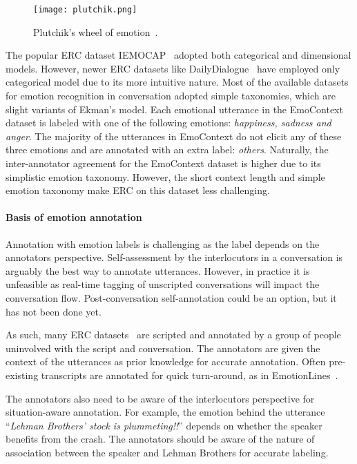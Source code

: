 \documentclass{IEEEtran}\usepackage[pdftex]{graphicx}
\begin{document}
	\begin{figure}
		\centering
		\texttt{[image: plutchik.png]}
		\caption{Plutchik's wheel of emotion~\citep{plutchik}.}
		\label{fig:plutchik}
	\end{figure}
	
	The popular ERC dataset IEMOCAP~\citep{busso2008iemocap} adopted both
	categorical and dimensional models. However, newer ERC datasets like
	DailyDialogue~\citep{li2017dailydialog} have employed only categorical model due to its more 
	intuitive nature. Most of the available datasets for emotion recognition in conversation adopted simple taxonomies, which are slight variants of Ekman's model. Each emotional utterance in the EmoContext dataset is labeled with one of the following emotions: \emph{happiness, sadness and anger}. The majority of the utterances in EmoContext do not elicit any of these three emotions and are annotated with an extra label: \emph{others}. Naturally, the inter-annotator agreement for the EmoContext dataset is higher due to its simplistic emotion taxonomy. However, the short context length and simple emotion taxonomy make ERC on this dataset less challenging.
	
	\paragraph{Basis of emotion annotation} 


	Annotation with emotion labels is challenging as the label depends on the annotators
	perspective. Self-assessment by the interlocutors in a conversation is arguably
	the best
	way to annotate utterances. However, in practice it is unfeasible as real-time 
	tagging of unscripted conversations will impact the conversation flow.
	Post-conversation self-annotation could be an option, but it has not been done yet.
	
	As such, many ERC datasets~\citep{busso2008iemocap} are scripted and annotated by a
	group of people
	uninvolved with the script and conversation. The annotators are given the context
	of the utterances as prior knowledge for accurate annotation. Often pre-existing transcripts are annotated for quick turn-around, as in EmotionLines~\citep{chen2018emotionlines}. 
	
	The annotators also need to be aware of the interlocutors
	perspective for situation-aware annotation. For example, the emotion behind the
	utterance ``\textit{Lehman Brothers' stock is plummeting!!}'' depends on whether
	the speaker benefits from the crash. The annotators should be aware of the nature
	of association between the speaker and Lehman Brothers for accurate labeling.
	
\end{document}
